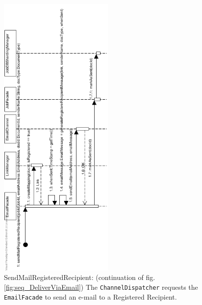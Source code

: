 \documentclass[a4paper,10pt]{article}
\begin{document}
\begin{figure}[!htp]
    \centering
    \includegraphics[width=0.5\textwidth]{SendMailRegisteredRecipient.png}
    \caption{SendMailRegisteredRecipient: (continuation of fig. \ref{fig:seq_DeliverViaEmail}) The \texttt{ChannelDispatcher} requests the \texttt{EmailFacade} to send an e-mail to a Registered Recipient.     
 }\label{fig:seq_SendMailRegisteredRecipient}
\end{figure}
\end{document}
